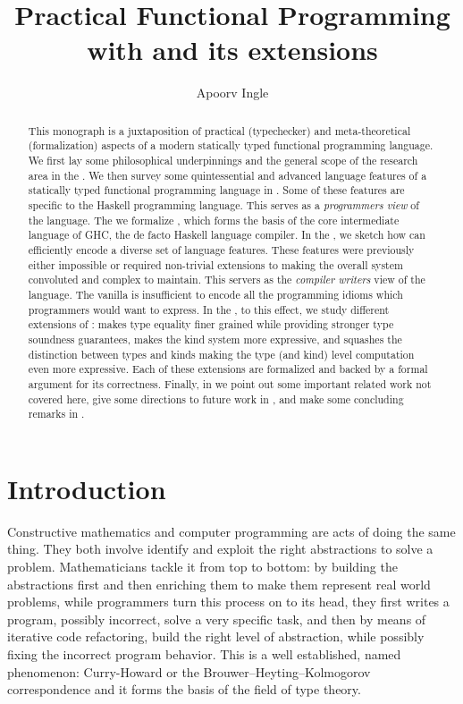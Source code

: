 \documentclass[screen,nonacm]{acmart}
\title{Practical Functional Programming with \SFC and its extensions}
\author{Apoorv Ingle}
\affiliation{%
  \institution{University of Iowa} \department{Department of Computer Science} \streetaddress{McLean Hall} \city{Iowa City} \state{Iowa} \country{USA}}
\begin{document}
\begin{abstract}
This monograph is a juxtaposition of practical (typechecker) and
meta-theoretical (formalization) aspects of a modern statically typed
functional programming language. We first lay
some philosophical underpinnings and the general scope of the research
area in the . We then survey some quintessential
and advanced language features of a statically typed
functional programming language in .
Some of these features are specific to the Haskell programming language.
This serves as a \emph{programmers view} of the language.
The  we formalize \SFC, which
forms the basis of the core intermediate language
of GHC, the de facto Haskell language compiler.
In the , we sketch how \SFC
can efficiently encode a diverse set of language features.
These features were previously either impossible or required non-trivial extensions
to \SF making the overall system convoluted and complex to maintain.
This servers as the \emph{compiler writers} view of the
language. The vanilla \SFC is insufficient to encode all the programming
idioms which programmers would want to express. In the
, to this effect, we study different
extensions of \SFC: \SFR makes type equality finer grained while
providing stronger type soundness guarantees, \SFP makes the kind system more
expressive, and \SFK squashes the distinction between types and kinds
making the type (and kind) level computation even more
expressive. Each of these extensions are formalized and backed by a formal
argument for its correctness. Finally, in  we point out some important related
work not covered here, give some directions to future
work in , and make some concluding remarks in .
\end{abstract}

\maketitle
\section{Introduction}\label{sec:introduction}
Constructive mathematics and computer programming are acts of doing
the same thing. They both involve identify and exploit the right
abstractions to solve a problem. Mathematicians tackle it from top to
bottom: by building the abstractions first and then enriching them
to make them represent real world problems, while programmers turn this process on to its
head, they first writes a program, possibly incorrect, solve a very specific
task, and then by means of iterative code refactoring, build the right level of
abstraction, while possibly fixing the incorrect program behavior.
This is a well established, named phenomenon: Curry-Howard or the
Brouwer–Heyting–Kolmogorov correspondence\cite{wadler_propositions_2015,han_deep_2023}
and it forms the basis of the field of type
theory\cite{barendregt_lambda_2013, hottbook_2013,nordstrom_programming_1990}.
\end{document}
